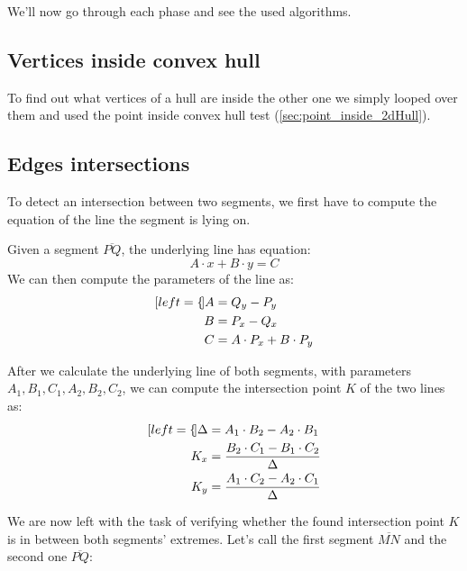 \documentclass{PoliMi_MasterThesis}
\begin{document}
We'll now go through each phase and see the used algorithms.

\subsection{Vertices inside convex hull}
To find out what vertices of a hull are inside the other one we simply looped over them and used the point inside convex hull test (\ref{sec:point_inside_2dHull}).

\subsection{Edges intersections}
To detect an intersection between two segments, we first have to compute the equation of the line the segment is lying on.

Given a segment $\overline{PQ}$, the underlying line has equation:
$$A\cdot x + B\cdot y = C$$
We can then compute the parameters of the line as:
\begin{subequations}
	\begin{align*}[left=\empheqlbrace]
		A &= Q_y - P_y\\
		B &= P_x - Q_x\\
		C &= A\cdot P_x + B\cdot P_y
	\end{align*}
\end{subequations}

After we calculate the underlying line of both segments, with parameters $A_1, B_1, C_1, A_2, B_2, C_2$, we can compute the intersection point $K$ of the two lines as:
\begin{subequations}
	\begin{align*}[left=\empheqlbrace]
		\Delta &= A_1 \cdot B_2 - A_2 \cdot B_1\\
		K_x &= \frac{B_2 \cdot C_1 - B_1 \cdot C_2}{\Delta}\\
		K_y &= \frac{A_1 \cdot C_2 - A_2 \cdot C_1}{\Delta}
	\end{align*}
\end{subequations}

We are now left with the task of verifying whether the found intersection point $K$ is in between both segments' extremes. Let's call the first segment $\overline{MN}$ and the second one $\overline{PQ}$:
\end{document}
